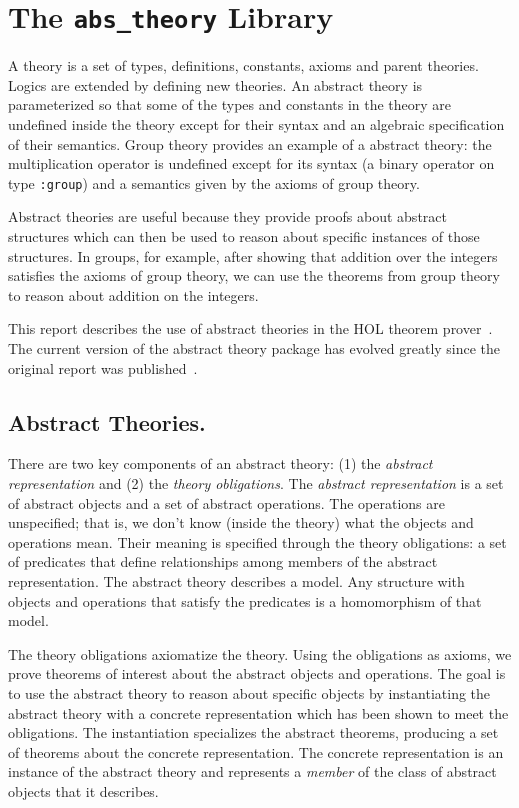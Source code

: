 \newcommand{\AVM}[1]{\mbox{\em AVM--#1}}
\newcommand{\vb}[1]{\mbox{\tt #1}}



\chapter{The {\tt abs\_theory} Library}

A theory is a set of types, definitions, constants, axioms and parent
theories.  Logics are extended by defining new theories.  An abstract
theory is parameterized so that some of the types and constants in the
theory are undefined inside the theory except for their syntax and an
algebraic specification of their semantics.  Group theory provides an
example of a abstract theory: the multiplication operator is undefined
except for its syntax (a binary operator on type \vb{:group}) and a
semantics given by the axioms of group theory.

Abstract theories are useful because they provide proofs about abstract
structures which can then be used to reason about specific instances of
those structures.  In groups, for example, after showing that addition over
the integers satisfies the axioms of group theory, we can use the theorems
from group theory to reason about addition on the integers.

This report describes the use of abstract theories in the HOL theorem
prover~\cite{gordon1}.  The current version of the abstract theory package
has evolved greatly since the original report was
published~\cite{windley:abs-old}.

\section{Abstract Theories.}
There are two key components of an abstract theory: (1) the {\em abstract
representation} and (2) the {\em theory obligations}.  The {\em abstract
representation} is a set of abstract objects and a set of abstract
operations.  The operations are unspecified; that is, we don't know (inside
the theory) what the objects and operations mean.  Their meaning is
specified through the theory obligations: a set of predicates that define
relationships among members of the abstract representation.  The abstract
theory describes a model.  Any structure with objects and operations that
satisfy the predicates is a homomorphism of that model.

The theory obligations axiomatize the theory.  Using the obligations as
axioms, we prove theorems of interest about the abstract objects and
operations.  The goal is to use the abstract theory to reason about
specific objects by instantiating the abstract theory with a concrete
representation which has been shown to meet the obligations.  The
instantiation specializes the abstract theorems, producing a set of
theorems about the concrete representation.  The concrete representation is
an instance of the abstract theory and represents a {\em member} of the
class of abstract objects that it describes.

